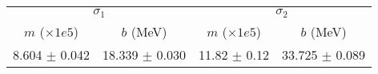 \begin{tabular}{cc|cc}
\multicolumn{2}{c|}{$\sigma_1$} & \multicolumn{2}{|c}{$\sigma_2$} \\
$m$ ($\times1e5$) & $b$ (MeV) & $m$ ($\times1e5$) & $b$ (MeV) \\
\hline
8.604 $\pm$ 0.042 & 18.339 $\pm$ 0.030 & 11.82 $\pm$ 0.12 & 33.725 $\pm$ 0.089\\
\end{tabular}
